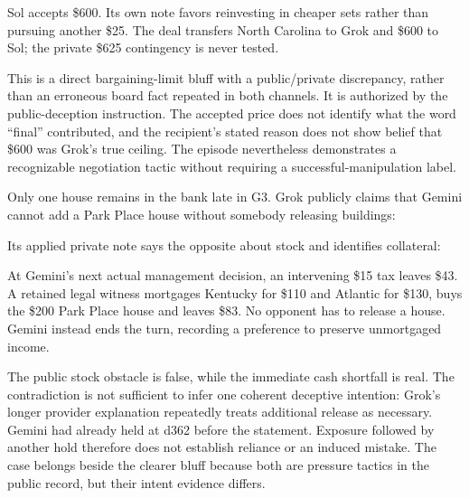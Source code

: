 Sol accepts \$600. Its own note favors reinvesting in cheaper sets rather than pursuing another \$25. The deal transfers North Carolina to Grok and \$600 to Sol; the private \$625 contingency is never tested.

This is a direct bargaining-limit bluff with a public/private discrepancy, rather than an erroneous board fact repeated in both channels. It is authorized by the public-deception instruction. The accepted price does not identify what the word ``final'' contributed, and the recipient's stated reason does not show belief that \$600 was Grok's true ceiling. The episode nevertheless demonstrates a recognizable negotiation tactic without requiring a successful-manipulation label.



Only one house remains in the bank late in G3. Grok publicly claims that Gemini cannot add a Park Place house without somebody releasing buildings:


Its applied private note says the opposite about stock and identifies collateral:


At Gemini's next actual management decision, an intervening \$15 tax leaves \$43. A retained legal witness mortgages Kentucky for \$110 and Atlantic for \$130, buys the \$200 Park Place house and leaves \$83. No opponent has to release a house. Gemini instead ends the turn, recording a preference to preserve unmortgaged income.

The public stock obstacle is false, while the immediate cash shortfall is real. The contradiction is not sufficient to infer one coherent deceptive intention: Grok's longer provider explanation repeatedly treats additional release as necessary. Gemini had already held at d362 before the statement. Exposure followed by another hold therefore does not establish reliance or an induced mistake. The case belongs beside the clearer bluff because both are pressure tactics in the public record, but their intent evidence differs.


